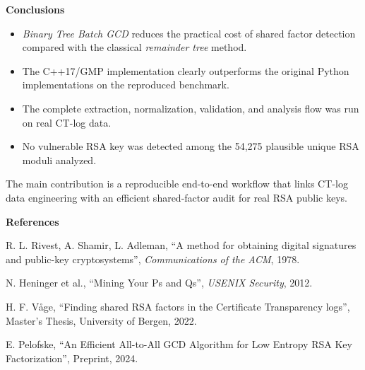 \documentclass{article}
\newlength{\postercolwidth}
\newenvironment{posterblock}[1]
{
  \vspace{1.0cm}
  \noindent
  \begin{minipage}{\postercolwidth}
  \colorbox{posterblue}{%
    \parbox{\dimexpr\postercolwidth-2\fboxsep\relax}{%
      \color{white}\bfseries\fontsize{32}{38}\selectfont #1
    }%
  }
  \par\vspace{0.22cm}
  \color{postergray}
  \fontsize{29}{35}\selectfont
}
{
  \end{minipage}
  \par
}
\begin{document}
\begin{minipage}[t]{\postercolwidth}
\begin{posterblock}{Conclusions}
\begin{itemize}
  \item \textit{Binary Tree Batch GCD} reduces the practical cost of shared
  factor detection compared with the classical \textit{remainder tree} method.
  \item The C++17/GMP implementation clearly outperforms the original Python
  implementations on the reproduced benchmark.
  \item The complete extraction, normalization, validation, and analysis flow
  was run on real CT-log data.
  \item No vulnerable RSA key was detected among the 54,275 plausible unique RSA
  moduli analyzed.
\end{itemize}

The main contribution is a reproducible end-to-end workflow that links CT-log
data engineering with an efficient shared-factor audit for real RSA public
keys.
\end{posterblock}

\begin{posterblock}{References}
\fontsize{18}{22}\selectfont
R. L. Rivest, A. Shamir, L. Adleman, ``A method for obtaining digital signatures and public-key cryptosystems'', \textit{Communications of the ACM}, 1978.

N. Heninger et al., ``Mining Your Ps and Qs'', \textit{USENIX Security}, 2012.

H. F. Våge, ``Finding shared RSA factors in the Certificate Transparency logs'', Master's Thesis, University of Bergen, 2022.

E. Pelofske, ``An Efficient All-to-All GCD Algorithm for Low Entropy RSA Key Factorization'', Preprint, 2024.
\end{posterblock}

\end{minipage}
\end{document}
